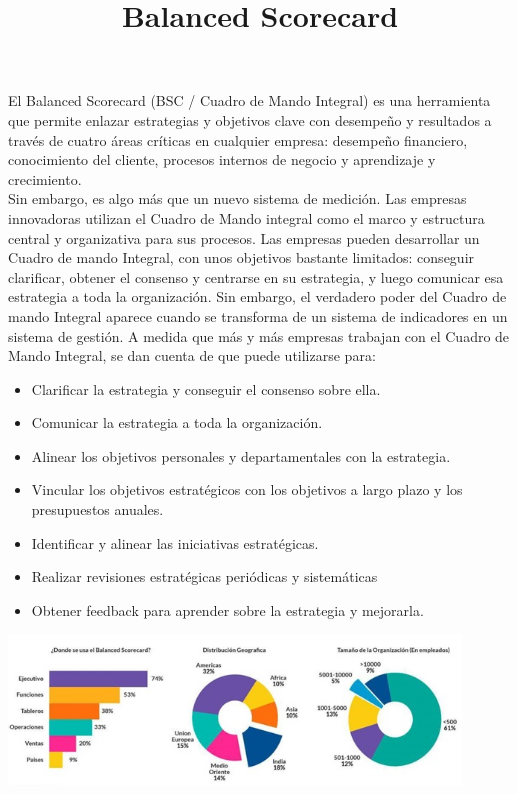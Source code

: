 \documentclass[preprint,12pt]{elsarticle}
\begin{document}
\title{Balanced Scorecard}
El Balanced Scorecard (BSC / Cuadro de Mando Integral) es una herramienta que permite enlazar estrategias y objetivos clave con desempeño y resultados a través de cuatro áreas críticas en cualquier empresa: desempeño financiero, conocimiento del cliente, procesos internos de negocio y aprendizaje y crecimiento. \\
Sin embargo, es algo más que un nuevo sistema de medición. Las empresas innovadoras utilizan el Cuadro de Mando integral como el marco y estructura central y organizativa para sus procesos. Las empresas pueden desarrollar un Cuadro de mando Integral, con unos objetivos bastante limitados: conseguir clarificar, obtener el consenso y centrarse en su estrategia, y luego comunicar esa estrategia a toda la organización. Sin embargo, el verdadero poder del Cuadro de mando Integral aparece cuando se transforma de un sistema de indicadores en un sistema de gestión. A medida que más y más empresas trabajan con el 
Cuadro de Mando Integral, se dan cuenta de que puede utilizarse para:
		\begin{itemize}
		\item Clarificar la estrategia y conseguir el consenso sobre ella.
		\item Comunicar la estrategia a toda la organización.
		\item Alinear los objetivos personales y departamentales con la estrategia.
		\item Vincular los objetivos estratégicos con los objetivos a largo plazo y los presupuestos anuales.
		\item Identificar y alinear las iniciativas estratégicas.
		\item Realizar revisiones estratégicas periódicas y sistemáticas
		\item Obtener feedback para aprender sobre la estrategia y mejorarla.
		\end{itemize}

\begin{center}
	\includegraphics[width=12cm]{./Imagenes/img1} 
\end{center}
\end{document}
